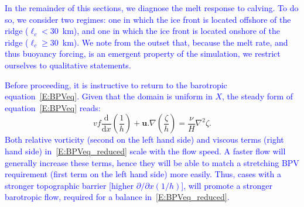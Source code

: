 \documentclass[draft]{agujournal2019}
\newcommand{\blue}[1]{\textcolor{blue}{#1}}
\begin{document}
\blue{In the remainder of this sections, we diagnose the melt response to calving. To do so, we consider two regimes: one in which the ice front is located offshore of the ridge ($\ell_c < 30$~km), and one in which the ice front is located onshore of the ridge  ($\ell_c \geq 30$~km). We note from the outset that, because the melt rate, and thus buoyancy forcing, is an emergent property of the simulation, we restrict ourselves to qualitative statements.}

\blue{Before proceeding, it is instructive to return to the barotropic equation~\eqref{E:BPVeq}. Given that the domain is uniform in $X$, the steady form of equation~\eqref{E:BPVeq} reads:}
\begin{equation}\label{E:BPVeq_reduced}
    v f  \frac{\mathrm{d}}{\mathrm{d}x} \left(\frac{1}{h}\right) + \mathbf{u}.\nabla \left(\frac{\zeta}{h}\right) = \frac{\nu}{H}\nabla^2 \zeta.
\end{equation}
\blue{Both relative vorticity (second on the left hand side) and viscous terms (right hand side) in~\eqref{E:BPVeq_reduced} scale with the flow speed. A faster flow will generally increase these terms, hence they will be able to match a stretching BPV requirement (first term on the left hand side) more easily. Thus, cases with a stronger topographic barrier [higher $\partial / \partial x (1/h)$], will promote a stronger barotropic flow, required for a balance in~\eqref{E:BPVeq_reduced}.}
\end{document}
